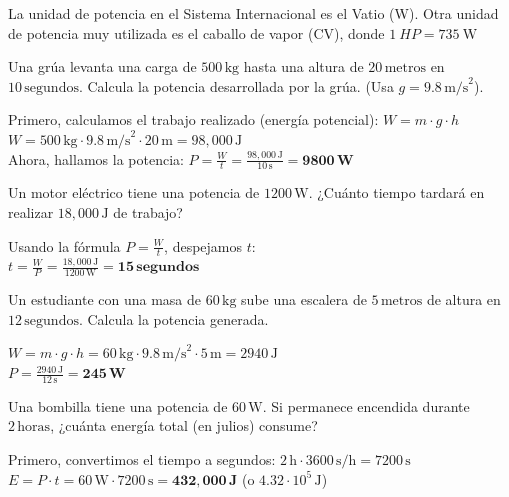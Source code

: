 La unidad de potencia en el Sistema Internacional es el Vatio (\unit{\watt}). Otra unidad de potencia muy utilizada es el caballo de vapor (CV), donde
\( 1\ HP = \qty{735}{\watt} \)

\begin{exercise}
    Una grúa levanta una carga de $500\,\text{kg}$ hasta una altura de $20\,\text{metros}$ en $10\,\text{segundos}$. Calcula la potencia desarrollada por la grúa. (Usa $g = 9.8\,\text{m/s}^2$).
    \begin{solu}
        Primero, calculamos el trabajo realizado (energía potencial): $W = m \cdot g \cdot h$ \\
        $W = 500\,\text{kg} \cdot 9.8\,\text{m/s}^2 \cdot 20\,\text{m} = 98,000\,\text{J}$ \\
        Ahora, hallamos la potencia: $P = \frac{W}{t} = \frac{98,000\,\text{J}}{10\,\text{s}} = \mathbf{9800\,\text{W}}$
    \end{solu}
\end{exercise}

\begin{exercise}
    Un motor eléctrico tiene una potencia de $1200\,\text{W}$. ¿Cuánto tiempo tardará en realizar $18,000\,\text{J}$ de trabajo?
    \begin{solu}
        Usando la fórmula $P = \frac{W}{t}$, despejamos $t$: \\
        $t = \frac{W}{P} = \frac{18,000\,\text{J}}{1200\,\text{W}} = \mathbf{15\,\text{segundos}}$
    \end{solu}
\end{exercise}

\begin{exercise}
    Un estudiante con una masa de $60\,\text{kg}$ sube una escalera de $5\,\text{metros}$ de altura en $12\,\text{segundos}$.
    Calcula la potencia generada.
    \begin{solu}
        $W = m \cdot g \cdot h = 60\,\text{kg} \cdot 9.8\,\text{m/s}^2 \cdot 5\,\text{m} = 2940\,\text{J}$ \\
        $P = \frac{2940\,\text{J}}{12\,\text{s}} = \mathbf{245\,\text{W}}$
    \end{solu}
\end{exercise}

\begin{exercise}
    Una bombilla tiene una potencia de $60\,\text{W}$.
    Si permanece encendida durante $2\,\text{horas}$, ¿cuánta energía total (en julios) consume?
    \begin{solu}
        Primero, convertimos el tiempo a segundos: $2\,\text{h} \cdot 3600\,\text{s/h} = 7200\,\text{s}$ \\
        $E = P \cdot t = 60\,\text{W} \cdot 7200\,\text{s} = \mathbf{432,000\,\text{J}}$ (o $4.32 \cdot 10^5\,\text{J}$)
    \end{solu}
\end{exercise}


